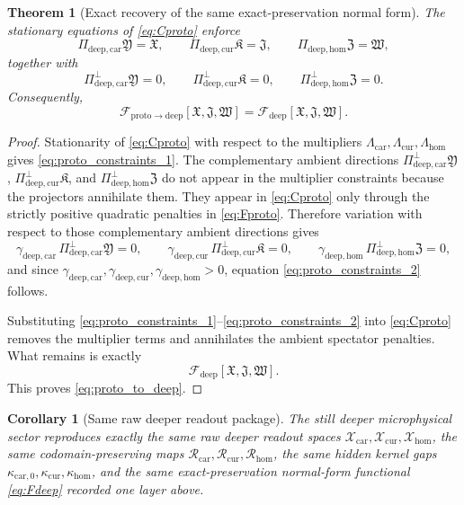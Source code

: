 \documentclass[11pt]{article}
\newcommand{\DeepFunctional}{\mathscr F_{\mathrm{deep}}}
\newcommand{\ProtoToDeep}{\mathscr F_{\mathrm{proto}\to\mathrm{deep}}}
\newcommand{\PreCarGap}{\kappa_{\mathrm{car},0}}
\newcommand{\CurrentGap}{\kappa_{\mathrm{cur}}}
\newcommand{\HomGap}{\kappa_{\mathrm{hom}}}
\newcommand{\DeepTensorClass}{\mathscr X_{\mathrm{car}}}
\newcommand{\DeepRelabelClass}{\mathscr X_{\mathrm{cur}}}
\newcommand{\DeepFreeClass}{\mathscr X_{\mathrm{hom}}}
\newcommand{\DeepTensor}{\mathfrak X}
\newcommand{\DeepRelabel}{\mathfrak J}
\newcommand{\DeepFree}{\mathfrak W}
\newcommand{\CarRead}{\mathcal R_{\mathrm{car}}}
\newcommand{\CurRead}{\mathcal R_{\mathrm{cur}}}
\newcommand{\HomRead}{\mathcal R_{\mathrm{hom}}}
\newcommand{\ProtoTensor}{\mathfrak Y}
\newcommand{\ProtoRelabel}{\mathfrak K}
\newcommand{\ProtoFree}{\mathfrak Z}
\newcommand{\ProtoCarProj}{\Pi_{\mathrm{deep,car}}}
\newcommand{\ProtoCurProj}{\Pi_{\mathrm{deep,cur}}}
\newcommand{\ProtoHomProj}{\Pi_{\mathrm{deep,hom}}}
\newcommand{\ProtoCarPerp}{\Pi_{\mathrm{deep,car}}^{\perp}}
\newcommand{\ProtoCurPerp}{\Pi_{\mathrm{deep,cur}}^{\perp}}
\newcommand{\ProtoHomPerp}{\Pi_{\mathrm{deep,hom}}^{\perp}}
\newcommand{\ProtoCarGap}{\gamma_{\mathrm{deep,car}}}
\newcommand{\ProtoCurGap}{\gamma_{\mathrm{deep,cur}}}
\newcommand{\ProtoHomGap}{\gamma_{\mathrm{deep,hom}}}
\newtheorem{corollary}{Corollary}
\newtheorem{theorem}{Theorem}
\begin{document}
\begin{theorem}[Exact recovery of the same exact-preservation normal form]
\label{thm:recoverdeep}
The stationary equations of \eqref{eq:Cproto} enforce
\begin{equation}
\ProtoCarProj\ProtoTensor=\DeepTensor,
\qquad
\ProtoCurProj\ProtoRelabel=\DeepRelabel,
\qquad
\ProtoHomProj\ProtoFree=\DeepFree,
\label{eq:proto_constraints_1}
\end{equation}
together with
\begin{equation}
\ProtoCarPerp\ProtoTensor=0,
\qquad
\ProtoCurPerp\ProtoRelabel=0,
\qquad
\ProtoHomPerp\ProtoFree=0.
\label{eq:proto_constraints_2}
\end{equation}
Consequently,
\begin{equation}
\ProtoToDeep[\DeepTensor,\DeepRelabel,\DeepFree]
=
\DeepFunctional[\DeepTensor,\DeepRelabel,\DeepFree].
\label{eq:proto_to_deep}
\end{equation}
\end{theorem}

\begin{proof}
Stationarity of \eqref{eq:Cproto} with respect to the multipliers \(\Lambda_{\mathrm{car}},\Lambda_{\mathrm{cur}},\Lambda_{\mathrm{hom}}\) gives \eqref{eq:proto_constraints_1}. The complementary ambient directions \(\ProtoCarPerp\ProtoTensor\), \(\ProtoCurPerp\ProtoRelabel\), and \(\ProtoHomPerp\ProtoFree\) do not appear in the multiplier constraints because the projectors annihilate them. They appear in \eqref{eq:Cproto} only through the strictly positive quadratic penalties in \eqref{eq:Fproto}. Therefore variation with respect to those complementary ambient directions gives
\[
\ProtoCarGap\,\ProtoCarPerp\ProtoTensor=0,
\qquad
\ProtoCurGap\,\ProtoCurPerp\ProtoRelabel=0,
\qquad
\ProtoHomGap\,\ProtoHomPerp\ProtoFree=0,
\]
and since \(\ProtoCarGap,\ProtoCurGap,\ProtoHomGap>0\), equation \eqref{eq:proto_constraints_2} follows.

Substituting \eqref{eq:proto_constraints_1}--\eqref{eq:proto_constraints_2} into \eqref{eq:Cproto} removes the multiplier terms and annihilates the ambient spectator penalties. What remains is exactly
\[
\DeepFunctional[\DeepTensor,\DeepRelabel,\DeepFree].
\]
This proves \eqref{eq:proto_to_deep}.
\end{proof}

\begin{corollary}[Same raw deeper readout package]
\label{cor:samedeep}
The still deeper microphysical sector reproduces exactly the same raw deeper readout spaces \(\DeepTensorClass,\DeepRelabelClass,\DeepFreeClass\), the same codomain-preserving maps \(\CarRead,\CurRead,\HomRead\), the same hidden kernel gaps \(\PreCarGap,\CurrentGap,\HomGap\), and the same exact-preservation normal-form functional \eqref{eq:Fdeep} recorded one layer above.
\end{corollary}
\end{document}
